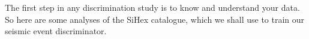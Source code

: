 The first step in any discrimination study is to know and understand your
data. So here are some analyses of the SiHex catalogue, which we shall use to
train our seismic event discriminator.
